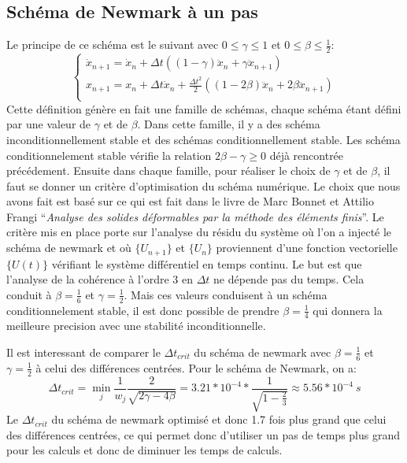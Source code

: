 \documentclass[]{article}
\begin{document}
\subsection{Schéma de Newmark à un pas}

Le principe de ce schéma est le suivant avec $0\leq\gamma\leq1$ et
$0\leq\beta\leq\frac{1}{2}$:
\[
\left \{
\begin{array}{l}
    \dot{x}_{n+1} = \dot{x}_{n} + \Delta t\left( \left( 1 - \gamma\right)  
\ddot{x}_{n} + \gamma \ddot{x}_{n+1}\right)  \\
    x_{n+1} = x_{n} + \Delta t\dot{x}_{n} + \frac{\Delta t^{2}}{2}\left(
\left(1 - 2 \beta\right) \ddot{x}_{n} + 2\beta\ddot{x}_{n+1}\right)  \\
\end{array}
\right.
\]
Cette définition génère en fait une famille de schémas, chaque schéma étant
défini par une valeur de $\gamma$ et de $\beta$. Dans cette famille, il y a des
schéma inconditionnellement stable et des schémas conditionnellement stable.
Les schéma conditionnelement stable vérifie la relation $2\beta-\gamma\geq0$
déjà rencontrée précédement. Ensuite dans chaque famille, pour réaliser le
choix de $\gamma$ et de $\beta$, il faut se donner un critère d'optimisation du
schéma numérique. Le choix que nous avons fait est basé sur ce qui est fait
dans le livre de Marc Bonnet et Attilio Frangi ``\textit{Analyse des solides
déformables par la méthode des éléments finis}''. Le critère mis en place porte
sur l'analyse du résidu du système où l'on a injecté le schéma de newmark et où
$\{U_{n+1}\}$ et $\{U_{n}\}$ proviennent d'une fonction vectorielle $\{U(t)\}$
vérifiant le système différentiel en temps continu. Le but est que l'analyse de
la cohérence à l'ordre 3 en $\Delta t$ ne dépende pas du temps. Cela conduit à
$\beta = \frac{1}{6}$ et $\gamma=\frac{1}{2}$. Mais ces valeurs conduisent à un
schéma conditionnelement stable, il est donc possible de prendre $\beta =
\frac{1}{4}$ qui donnera la meilleure precision avec une stabilité
inconditionnelle.

Il est interessant de comparer le $\Delta t_{crit}$ du schéma de newmark avec
$\beta = \frac{1}{6}$ et $\gamma=\frac{1}{2}$ à celui des différences centrées.
Pour le schéma de Newmark, on a:
$$
\Delta t_{crit} = \min_{j} \frac{1}{w_{j}} \frac{2}{\sqrt{2\gamma - 4\beta}} =
3.21*10^{-4}*\frac{1}{\sqrt{1 - \frac{2}{3}}} \approx 5.56*10^{-4}\ s
$$
Le $\Delta t_{crit}$ du schéma de newmark optimisé et donc 1.7 fois plus grand
que celui des différences centrées, ce qui permet donc d'utiliser un pas de
temps plus grand pour les calculs et donc de diminuer les temps de calculs.
\end{document}
